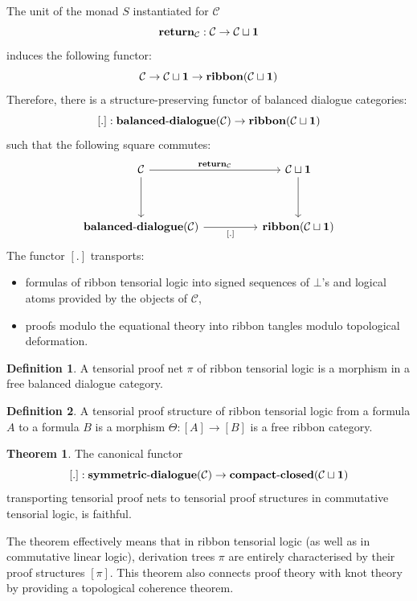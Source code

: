 \documentclass[8pt]{article}
\theoremstyle{definition}
\newtheorem{definition}{Definition}[section]
\theoremstyle{definition}
\newtheorem{theorem}{Theorem}[section]
\theoremstyle{definition}
\theoremstyle{definition}
\theoremstyle{definition}
\theoremstyle{definition}
\theoremstyle{definition}
\theoremstyle{definition}
\theoremstyle{definition}
\theoremstyle{definition}
\theoremstyle{definition}
\theoremstyle{definition}
\theoremstyle{definition}
\theoremstyle{definition}
\theoremstyle{question}
\begin{document}
The unit of the monad $S$ instantiated for $\mathcal{C}$
\[
{\bf return}_{\mathcal{C}} : \mathcal{C} \to \mathcal{C} \sqcup {\bf 1}
\]
induces the following functor:
\[
\mathcal{C} \to \mathcal{C} \sqcup {\bf 1} \to {\bf ribbon}(\mathcal{C} \sqcup {\bf 1})
\]
Therefore, there is a structure-preserving functor of balanced dialogue categories:
\[
[.] : \operatorname{\bf balanced-dialogue}(\mathcal{C}) \to {\bf ribbon}(\mathcal{C} \sqcup {\bf 1})
\]
such that the following square commutes:
\[
\begin{tikzcd}
  \mathcal{C} \ar[dd] \ar[rr, "{\bf return}_{\mathcal{C}}"] && \mathcal{C} \sqcup {\bf 1} \ar[dd] \\
  \\
  \operatorname{\bf balanced-dialogue}(\mathcal{C}) \ar[rr, "{[}.{]}"'] && {\bf ribbon}(\mathcal{C} \sqcup {\bf 1})
\end{tikzcd}
\]
The functor $[.]$ transports:
\begin{itemize}
  \item formulas of ribbon tensorial logic into signed sequences of $\bot$'s and logical atoms provided by 
  the objects of $\mathcal{C}$,
  \item proofs modulo the equational theory into ribbon tangles modulo topological deformation.
\end{itemize}

\begin{definition} A tensorial proof net $\pi$ of ribbon tensorial logic is a morphism in a free balanced dialogue category.
\end{definition}

\begin{definition}
  A tensorial proof structure of ribbon tensorial logic from a formula $A$ to a formula $B$ is a morphism 
  $\Theta : [A] \to [B]$ is a free ribbon category.
\end{definition}

\begin{theorem}
  The canonical functor
  \[
  [.] : \operatorname{\bf symmetric-dialogue}(\mathcal{C}) \to \operatorname{\bf compact-closed}(\mathcal{C} \sqcup {\bf 1})
  \]
  transporting tensorial proof nets to tensorial proof structures in commutative tensorial logic, is faithful.
\end{theorem}

The theorem effectively means that in ribbon tensorial logic (as well as in commutative linear logic),
derivation trees $\pi$ are entirely characterised by their proof structures $[\pi]$. This theorem also connects
proof theory with knot theory by providing a topological coherence theorem.
\end{document}
